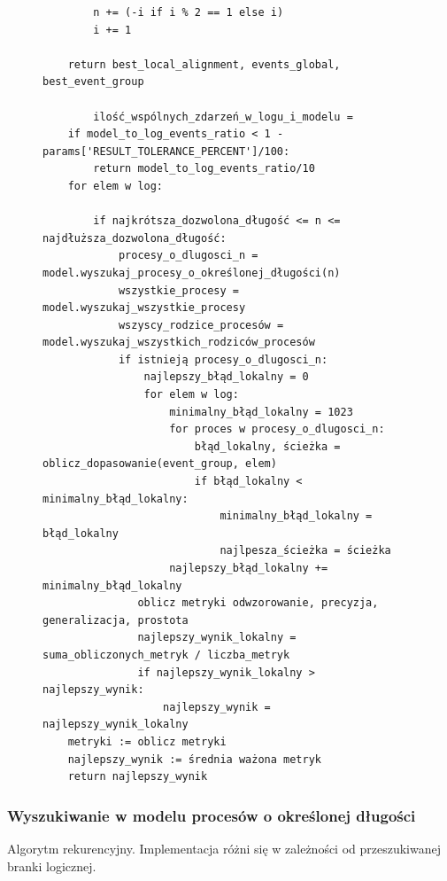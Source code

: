 \begin{figure}[!ht]
\begin{lstlisting}
        n += (-i if i % 2 == 1 else i)
        i += 1

    return best_local_alignment, events_global, best_event_group
    
    	ilość_wspólnych_zdarzeń_w_logu_i_modelu = 			   
	if model_to_log_events_ratio < 1 - params['RESULT_TOLERANCE_PERCENT']/100:
        return model_to_log_events_ratio/10
	for elem w log:
		
        if najkrótsza_dozwolona_długość <= n <= najdłuższa_dozwolona_długość:
            procesy_o_dlugosci_n = model.wyszukaj_procesy_o_określonej_długości(n)
            wszystkie_procesy = model.wyszukaj_wszystkie_procesy
            wszyscy_rodzice_procesów = model.wyszukaj_wszystkich_rodziców_procesów
            if istnieją procesy_o_dlugosci_n:
                najlepszy_błąd_lokalny = 0
                for elem w log:
                    minimalny_błąd_lokalny = 1023
                    for proces w procesy_o_dlugosci_n:
                        błąd_lokalny, ścieżka = oblicz_dopasowanie(event_group, elem)
                        if błąd_lokalny < minimalny_błąd_lokalny:
                            minimalny_błąd_lokalny = błąd_lokalny
                            najlpesza_ścieżka = ścieżka
                    najlepszy_błąd_lokalny += minimalny_błąd_lokalny
               oblicz metryki odwzorowanie, precyzja, generalizacja, prostota 
               najlepszy_wynik_lokalny = suma_obliczonych_metryk / liczba_metryk
               if najlepszy_wynik_lokalny > najlepszy_wynik:
                   najlepszy_wynik = najlepszy_wynik_lokalny
	metryki := oblicz metryki 
	najlepszy_wynik := średnia ważona metryk
    return najlepszy_wynik
\end{lstlisting}
\end{figure}

\subsubsection{Wyszukiwanie w modelu procesów o określonej długości}

Algorytm rekurencyjny. Implementacja różni się w zależności od przeszukiwanej branki logicznej.
\begin{figure}[!ht]
\lstset{caption=Wyszukiwanie procesów o długości n, captionpos=b}
\lstset{label=src:get_n_length, frame=single}
\begin{lstlisting}
\end{lstlisting}
\end{figure}


